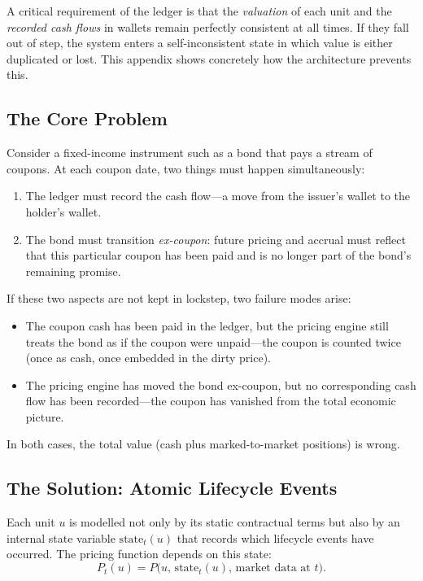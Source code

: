 \documentclass[11pt,a4paper]{article}
\begin{document}
A critical requirement of the ledger is that the \textit{valuation} of each unit and the \textit{recorded cash flows} in wallets remain perfectly consistent at all times. If they fall out of step, the system enters a self-inconsistent state in which value is either duplicated or lost. This appendix shows concretely how the architecture prevents this.

\subsection{The Core Problem}

Consider a fixed-income instrument such as a bond that pays a stream of coupons. At each coupon date, two things must happen simultaneously:

\begin{enumerate}
\item The ledger must record the cash flow---a move from the issuer's wallet to the holder's wallet.
\item The bond must transition \textit{ex-coupon}: future pricing and accrual must reflect that this particular coupon has been paid and is no longer part of the bond's remaining promise.
\end{enumerate}

If these two aspects are not kept in lockstep, two failure modes arise:

\begin{itemize}
\item The coupon cash has been paid in the ledger, but the pricing engine still treats the bond as if the coupon were unpaid---the coupon is counted twice (once as cash, once embedded in the dirty price).
\item The pricing engine has moved the bond ex-coupon, but no corresponding cash flow has been recorded---the coupon has vanished from the total economic picture.
\end{itemize}

In both cases, the total value (cash plus marked-to-market positions) is wrong.

\subsection{The Solution: Atomic Lifecycle Events}

Each unit $u$ is modelled not only by its static contractual terms but also by an internal state variable $\text{state}_t(u)$ that records which lifecycle events have occurred. The pricing function depends on this state:
\[
P_t(u) = P\big(u,\, \text{state}_t(u),\, \text{market data at } t\big).
\]
\end{document}
